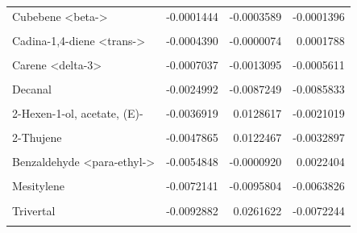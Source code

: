 \documentclass[12pt,final,CPage]{ufthesis}
\begin{document}
{\begin{longtable}[t]{lrrr}
  Cubebene <beta-> & -0.0001444 & -0.0003589 & -0.0001396\\
  \addlinespace
  \cellcolor{gray!6}{Acetic acid, hexyl ester} & \cellcolor{gray!6}{-0.0001900} & \cellcolor{gray!6}{-0.0000032} & \cellcolor{gray!6}{0.0000774}\\
  Cadina-1,4-diene <trans-> & -0.0004390 & -0.0000074 & 0.0001788\\
  \cellcolor{gray!6}{Bourbonene <beta->} & \cellcolor{gray!6}{-0.0005735} & \cellcolor{gray!6}{-0.0017143} & \cellcolor{gray!6}{-0.0012675}\\
  Carene <delta-3> & -0.0007037 & -0.0013095 & -0.0005611\\
  \cellcolor{gray!6}{Pentane, 3-ethyl-2,2-dimethyl-} & \cellcolor{gray!6}{-0.0013798} & \cellcolor{gray!6}{0.0001407} & \cellcolor{gray!6}{0.0039958}\\
  \addlinespace
  Decanal & -0.0024992 & -0.0087249 & -0.0085833\\
  \cellcolor{gray!6}{Pinene <1R-alpha->} & \cellcolor{gray!6}{-0.0027658} & \cellcolor{gray!6}{-0.0254298} & \cellcolor{gray!6}{-0.0273103}\\
  2-Hexen-1-ol, acetate, (E)- & -0.0036919 & 0.0128617 & -0.0021019\\
  \cellcolor{gray!6}{Murrolene <alpha->} & \cellcolor{gray!6}{-0.0044423} & \cellcolor{gray!6}{-0.0066743} & \cellcolor{gray!6}{-0.0045472}\\
  2-Thujene & -0.0047865 & 0.0122467 & -0.0032897\\
  \addlinespace
  \cellcolor{gray!6}{Myrcene <beta->} & \cellcolor{gray!6}{-0.0049257} & \cellcolor{gray!6}{0.0158254} & \cellcolor{gray!6}{-0.0045154}\\
  Benzaldehyde <para-ethyl-> & -0.0054848 & -0.0000920 & 0.0022404\\
  \cellcolor{gray!6}{Elemene <beta->} & \cellcolor{gray!6}{-0.0062990} & \cellcolor{gray!6}{-0.0001063} & \cellcolor{gray!6}{0.0025657}\\
  Mesitylene & -0.0072141 & -0.0095804 & -0.0063826\\
  \cellcolor{gray!6}{Copaene <alpha->} & \cellcolor{gray!6}{-0.0073516} & \cellcolor{gray!6}{-0.0011129} & \cellcolor{gray!6}{0.0020442}\\
  \addlinespace
  Trivertal & -0.0092882 & 0.0261622 & -0.0072244\\
  \cellcolor{gray!6}{5-Hepten-2-one, <6-methyl->} & \cellcolor{gray!6}{-0.0103809} & \cellcolor{gray!6}{0.0313532} & \cellcolor{gray!6}{-0.0115541}\\

\end{longtable}}
\end{document}
